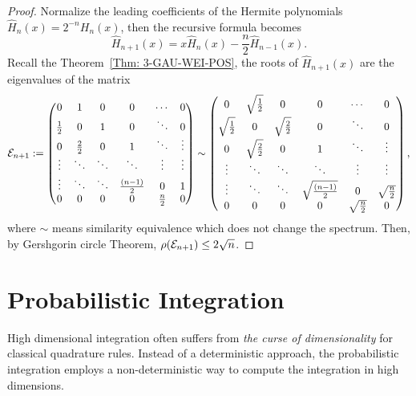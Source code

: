 \begin{proof}
    Normalize the leading coefficients of the Hermite polynomials $\hat{H}_n(x) = 2^{-n} H_n(x)$, then the recursive formula becomes 
    \begin{equation}
        \hat{H}_{n+1}(x) = x \hat{H}_n(x) - \frac{n}{2} \hat{H}_{n-1}(x).
    \end{equation}
    Recall the Theorem~\ref{Thm: 3-GAU-WEI-POS}, the roots of $\hat{H}_{n+1}(x)$ are the eigenvalues of the matrix 
\begin{equation}
       \mathcal E_{n+1}:= \begin{pmatrix}
           0 & 1 & 0 & 0 & \cdots & 0\\
           \frac{1}{2} & 0 & 1 & 0 & \ddots & 0\\ 
           0 & \frac{2}{2} & 0 &  1 & \ddots & \vdots  \\
           \vdots & \ddots & \ddots & \ddots & \vdots & \vdots \\
           \vdots & \ddots & \ddots & \frac{(n-1)}{2} & 0 & 1 \\
           0 & 0 & 0 & 0 & \frac{n}{2} & 0
       \end{pmatrix} \sim \begin{pmatrix}
           0 &  \sqrt{\frac{1}{2}} & 0 & 0 & \cdots & 0\\
           \sqrt{\frac{1}{2}} & 0 &  \sqrt{\frac{2}{2}} & 0 & \ddots & 0\\ 
           0 &  \sqrt{\frac{2}{2}} & 0 &  1 & \ddots & \vdots  \\
           \vdots & \ddots & \ddots & \ddots & \vdots & \vdots \\
           \vdots & \ddots & \ddots & \sqrt{\frac{(n-1)}{2}} & 0 & \sqrt{\frac{n}{2}} \\
           0 & 0 & 0 & 0 & \sqrt{\frac{n}{2}} & 0
       \end{pmatrix},
   \end{equation}
   where $\sim$ means similarity equivalence which does not change the spectrum. Then, by Gershgorin circle Theorem, $\rho(\mathcal E_{n+1}) \le 2 \sqrt{n}$.  
\end{proof}

\section{Probabilistic Integration}
\label{Sec: 3-Pro-Int}
High dimensional integration often suffers from \emph{the curse of dimensionality} for classical quadrature rules. Instead of a deterministic approach, the probabilistic integration employs a non-deterministic way to compute the integration in high dimensions. 

